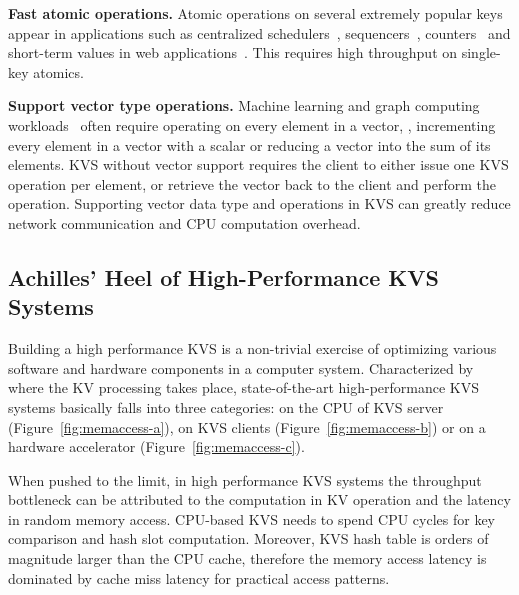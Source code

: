 \textbf{Fast atomic operations.}
Atomic operations on several extremely popular keys appear in applications such as centralized schedulers~\cite{perry2014fastpass}, sequencers~\cite{kalia2016design}, counters~\cite{zhu2015packet} and short-term values in web applications~\cite{atikoglu2012workload}.
This requires high throughput on single-key atomics.

\textbf{Support vector type operations.}
Machine learning and graph computing workloads~\cite{li2014scaling,shao2013trinity,xiao17tux2} often require operating on every element in a vector,
\eg, incrementing every element in a vector with a scalar or reducing a vector into the sum of its elements.
KVS without vector support requires the client to either issue one KVS operation per element, or retrieve the vector back to the client and perform the operation.
Supporting vector data type and operations in KVS can greatly reduce network communication and CPU computation overhead.


\subsection{Achilles' Heel of High-Performance KVS Systems}
\label{sec:state-of-the-art-kvs}

Building a high performance KVS is a non-trivial exercise of optimizing various software and hardware components in a computer system.
Characterized by where the KV processing takes place, state-of-the-art high-performance KVS systems basically falls into three categories:
on the CPU of KVS server
(Figure~\ref{fig:memaccess-a}),
on KVS clients
(Figure~\ref{fig:memaccess-b})
or on a hardware accelerator
(Figure~\ref{fig:memaccess-c}).

When pushed to the limit, in high performance KVS systems the throughput bottleneck can be attributed to the computation in KV operation and the latency in random memory access.
CPU-based KVS needs to spend CPU cycles for key comparison and hash slot computation.
Moreover, KVS hash table is orders of magnitude larger than the CPU cache, therefore the memory access latency is dominated by cache miss latency for practical access patterns.

